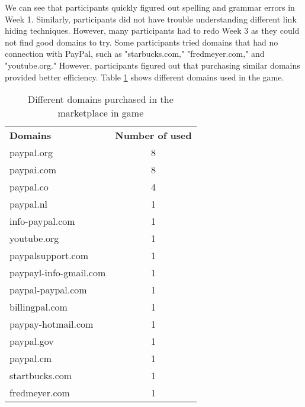 We can see that participants quickly figured out spelling and grammar errors in Week 1. Similarly, participants did not have trouble understanding different link hiding techniques. However, many participants had to redo Week 3 as they could not find good domains to try. Some participants tried domains that had no connection with PayPal, such as "starbucks.com," "fredmeyer.com," and "youtube.org." However, participants figured out that purchasing similar domains provided better efficiency. Table \ref{tab:marketplace_domains} shows different domains used in the game.

\begin{table}[!ht]
    \centering
    \begin{tabular}{l c  }
        \hline
        \textbf{Domains}       & \textbf{Number of used} \\
        paypal.org             & 8                       \\
        paypai.com             & 8                       \\
        paypal.co              & 4                       \\
        paypal.nl              & 1                       \\
        info-paypal.com        & 1                       \\
        youtube.org            & 1                       \\
        paypalsupport.com      & 1                       \\
        paypayl-info-gmail.com & 1                       \\
        paypal-paypal.com      & 1                       \\
        billingpal.com         & 1                       \\
        paypay-hotmail.com     & 1                       \\
        paypal.gov             & 1                       \\
        paypal.cm              & 1                       \\
        startbucks.com         & 1                       \\
        fredmeyer.com          & 1                       \\
        \hline
    \end{tabular}
    \caption{Different domains purchased in the marketplace in game}
    \label{tab:marketplace_domains}
\end{table}

